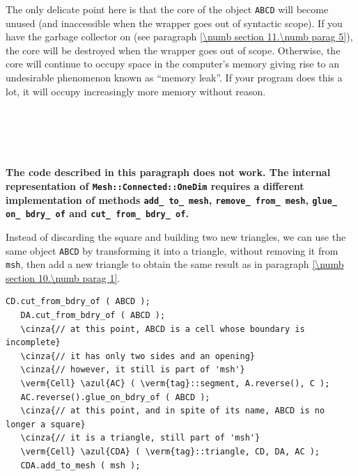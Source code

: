 The only delicate point here is that the core of the {\small\tt{}} object
{\small\tt ABCD}
will become unused (and inaccessible when the wrapper goes out of syntactic scope).
If you have the garbage collector on (see paragraph \ref{\numb section 11.\numb parag 5}),
the core will be destroyed when the wrapper goes out of scope.
Otherwise, the core will continue to occupy space in the computer's memory giving rise
to an undesirable phenomenon known as ``memory leak''.
If your program does this a lot, it will occupy increasingly more memory without reason.


\section{~~}\label{\numb section 10.\numb parag 2}

{\normalfont\bfseries The code described in this paragraph does not work.
The internal representation of {\small\tt Mesh::Connected::OneDim} requires a different
implementation of methods {\small\tt add\_\,to\_\,mesh}, {\small\tt remove\_\,from\_\,mesh},
{\small\tt glue\_\,on\_\,bdry\_\,of} and {\small\tt cut\_\,from\_\,bdry\_\,of}.              }

Instead of discarding the square and building two new triangles, we can use the same
{\small\tt{}} object {\small\tt ABCD}
by transforming it into a triangle, without removing it from {\small\tt msh}, then add
a new triangle to obtain the same result as in paragraph \ref{\numb section 10.\numb parag 1}.

\begin{Verbatim}[commandchars=\\\{\},formatcom=\small\tt,frame=single,
   label=main-\ref{\numb section 10.\numb parag 2}.cpp,rulecolor=\color{coment},
   baselinestretch=0.94,framesep=2mm]
   CD.cut_from_bdry_of ( ABCD );
   DA.cut_from_bdry_of ( ABCD );
   \cinza{// at this point, ABCD is a cell whose boundary is incomplete}
   \cinza{// it has only two sides and an opening}
   \cinza{// however, it still is part of 'msh'}
   \verm{Cell} \azul{AC} ( \verm{tag}::segment, A.reverse(), C );
   AC.reverse().glue_on_bdry_of ( ABCD );
   \cinza{// at this point, and in spite of its name, ABCD is no longer a square}
   \cinza{// it is a triangle, still part of 'msh'}
   \verm{Cell} \azul{CDA} ( \verm{tag}::triangle, CD, DA, AC );
   CDA.add_to_mesh ( msh );
\end{Verbatim}



